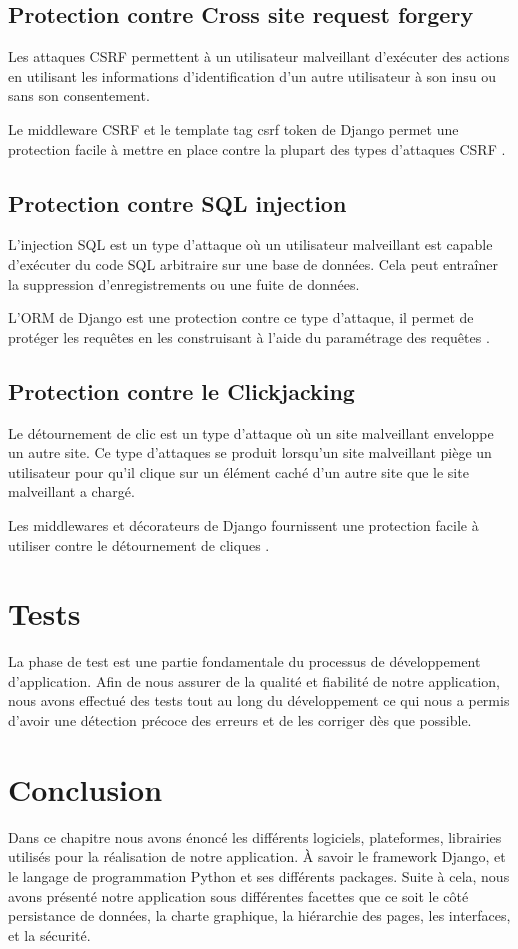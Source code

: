 \subsection{Protection contre Cross site request forgery}
Les attaques CSRF permettent à un utilisateur malveillant d'exécuter des actions 
en utilisant les informations d'identification d'un autre utilisateur à son insu 
ou sans son consentement.

Le middleware CSRF et le template tag csrf token de Django permet une protection 
facile à mettre en place contre la plupart des types d'attaques CSRF \cite{18}.

\subsection{Protection contre SQL injection}
L'injection SQL est un type d'attaque où un utilisateur malveillant est capable 
d'exécuter du code SQL arbitraire sur une base de données. Cela peut entraîner 
la suppression d'enregistrements ou une fuite de données.

L’ORM de Django est une protection contre ce type d’attaque, il permet de 
protéger les requêtes en les construisant à l'aide du paramétrage des requêtes \cite{18}.

\subsection{Protection contre le Clickjacking}
Le détournement de clic est un type d'attaque où un site malveillant enveloppe 
un autre site. Ce type d’attaques se produit lorsqu’un site malveillant piège un 
utilisateur pour qu’il clique sur un élément caché d’un autre site que le site 
malveillant a chargé. 

Les middlewares et décorateurs de Django fournissent une protection facile à 
utiliser contre le détournement de cliques \cite{18}.

\section{Tests}
La phase de test est une partie fondamentale du processus de développement 
d’application. Afin de nous assurer de la qualité et fiabilité de notre 
application, nous avons effectué des tests tout au long du développement ce qui 
nous a permis d’avoir une détection précoce des erreurs et de les corriger dès 
que possible.

\section{Conclusion}
Dans ce chapitre nous avons énoncé les différents logiciels, plateformes,
librairies utilisés pour la réalisation de notre application. À savoir le
framework Django, et le langage de programmation Python et ses différents
packages.  Suite à cela, nous avons présenté notre application sous différentes
facettes que ce soit le côté persistance de données, la charte graphique, la
hiérarchie des pages, les interfaces, et la sécurité.

